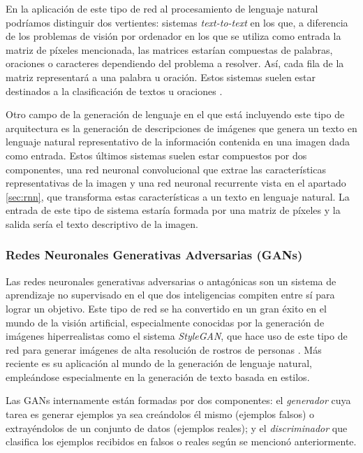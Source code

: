 En la aplicación de este tipo de red al procesamiento de lenguaje natural podríamos distinguir dos vertientes: sistemas \textit{text-to-text} en los que, a diferencia de los problemas de visión por ordenador en los que se utiliza como entrada la matriz de píxeles mencionada, las matrices estarían compuestas de palabras, oraciones o caracteres dependiendo del problema a resolver. Así, cada fila de la matriz representará a una palabra u oración. Estos sistemas suelen estar destinados a la clasificación de textos u oraciones  \citep{jacovi2018understanding,Lai2015RecurrentCN,Kim2014ConvolutionalNN}.

Otro campo de la generación de lenguaje en el que está incluyendo este tipo de arquitectura es la generación de descripciones de imágenes \citep{He2017DeepLF} que genera un texto en lenguaje natural representativo de la información contenida en una imagen dada como entrada. Estos últimos sistemas suelen estar compuestos por dos componentes, una red neuronal convolucional que extrae las características representativas de la imagen y una red neuronal recurrente vista en el apartado \ref{sec:rnn}, que transforma estas características a un texto en lenguaje natural. La entrada de este tipo de sistema estaría formada por una matriz de píxeles y la salida sería el texto descriptivo de la imagen.

\subsubsection{Redes Neuronales Generativas Adversarias (GANs)}
Las redes neuronales generativas adversarias o antagónicas son un sistema de aprendizaje no supervisado en el que dos inteligencias compiten entre sí para lograr un objetivo. Este tipo de red se ha convertido en un gran éxito en el mundo de la visión artificial, especialmente conocidas por la generación de imágenes hiperrealistas como el sistema \textit{StyleGAN}, que hace uso de este tipo de red para generar imágenes de alta resolución de rostros de personas \citep{Karras2019ASG}. Más reciente es su aplicación al mundo de la generación de lenguaje natural, empleándose especialmente en la generación de texto basada en estilos.

Las GANs internamente están formadas por dos componentes: el \textit{generador} cuya tarea es generar ejemplos ya sea creándolos él mismo (ejemplos falsos) o extrayéndolos de un conjunto de datos (ejemplos reales); y el \textit{discriminador} que clasifica los ejemplos recibidos en falsos o reales según se mencionó anteriormente.

